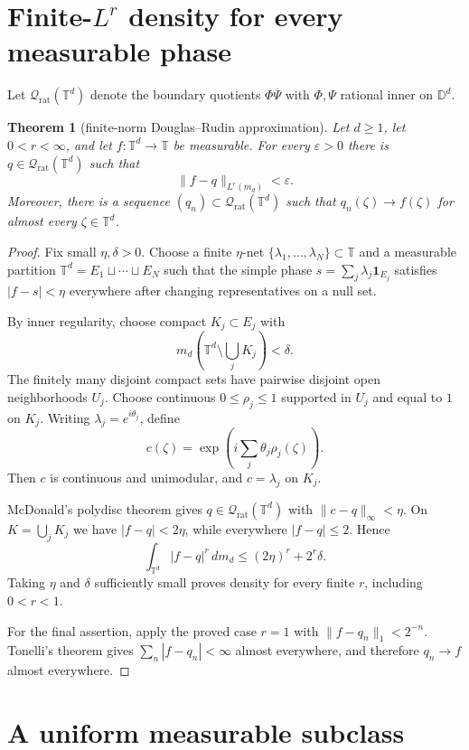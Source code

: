 \documentclass[11pt]{article}
\newtheorem{theorem}{Theorem}
\newcommand{\T}{\mathbb T}
\newcommand{\D}{\mathbb D}
\newcommand{\Q}{\mathcal Q}
\begin{document}
\section{Finite-$L^r$ density for every measurable phase}

Let $\Q_{\mathrm{rat}}(\T^d)$ denote the boundary quotients
$\Phi\overline\Psi$ with $\Phi,\Psi$ rational inner on $\D^d$.

\begin{theorem}[finite-norm Douglas--Rudin approximation]
\label{thm:Lr}
Let $d\geq1$, let $0<r<\infty$, and let
$f:\T^d\to\T$ be measurable.  For every $\varepsilon>0$ there is
$q\in\Q_{\mathrm{rat}}(\T^d)$ such that
\[
                 \|f-q\|_{L^r(m_d)}<\varepsilon.
\]
Moreover, there is a sequence $(q_n)\subset\Q_{\mathrm{rat}}(\T^d)$
such that $q_n(\zeta)\to f(\zeta)$ for almost every $\zeta\in\T^d$.
\end{theorem}

\begin{proof}
Fix small $\eta,\delta>0$.  Choose a finite $\eta$-net
$\{\lambda_1,\ldots,\lambda_N\}\subset\T$ and a measurable partition
$\T^d=E_1\sqcup\cdots\sqcup E_N$ such that the simple phase
$s=\sum_j\lambda_j\mathbf1_{E_j}$ satisfies $|f-s|<\eta$ everywhere after
changing representatives on a null set.

By inner regularity, choose compact $K_j\subset E_j$ with
\[
       m_d\!\left(\T^d\setminus\bigcup_j K_j\right)<\delta.
\]
The finitely many disjoint compact sets have pairwise disjoint open
neighborhoods $U_j$.  Choose continuous $0\leq\rho_j\leq1$ supported in
$U_j$ and equal to $1$ on $K_j$.  Writing $\lambda_j=e^{i\theta_j}$, define
\[
                c(\zeta)=\exp\!\left(i\sum_j\theta_j\rho_j(\zeta)\right).
\]
Then $c$ is continuous and unimodular, and $c=\lambda_j$ on $K_j$.

McDonald's polydisc theorem gives $q\in\Q_{\mathrm{rat}}(\T^d)$ with
$\|c-q\|_\infty<\eta$.  On $K=\bigcup_jK_j$ we have
$|f-q|<2\eta$, while everywhere $|f-q|\leq2$.  Hence
\[
       \int_{\T^d}|f-q|^r\,dm_d
       \leq (2\eta)^r+2^r\delta.
\]
Taking $\eta$ and $\delta$ sufficiently small proves density for every finite
$r$, including $0<r<1$.

For the final assertion, apply the proved case $r=1$ with
$\|f-q_n\|_1<2^{-n}$.  Tonelli's theorem gives
$\sum_n|f-q_n|<\infty$ almost everywhere, and therefore $q_n\to f$ almost
everywhere.
\end{proof}

\section{A uniform measurable subclass}
\end{document}
